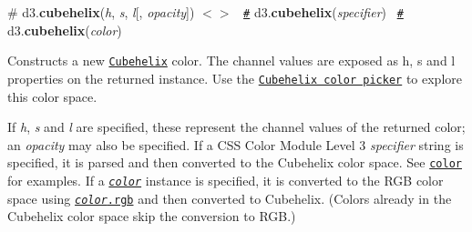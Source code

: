 \label{_cubehelix}%
\# d3.{\bfseries cubehelix}({\itshape h}, {\itshape s}, {\itshape l}\mbox{[}, {\itshape opacity}\mbox{]}) \href{https://github.com/d3/d3-color/blob/master/src/cubehelix.js#L32}{\tt $<$$>$}~\newline
 \href{#cubehelix}{\tt \#} d3.{\bfseries cubehelix}({\itshape specifier})~\newline
 \href{#cubehelix}{\tt \#} d3.{\bfseries cubehelix}({\itshape color})~\newline


Constructs a new \href{https://www.mrao.cam.ac.uk/~dag/CUBEHELIX/}{\tt Cubehelix} color. The channel values are exposed as {\ttfamily h}, {\ttfamily s} and {\ttfamily l} properties on the returned instance. Use the \href{http://bl.ocks.org/mbostock/ba8d75e45794c27168b5}{\tt Cubehelix color picker} to explore this color space.

If {\itshape h}, {\itshape s} and {\itshape l} are specified, these represent the channel values of the returned color; an {\itshape opacity} may also be specified. If a C\+SS Color Module Level 3 {\itshape specifier} string is specified, it is parsed and then converted to the Cubehelix color space. See \href{#color}{\tt color} for examples. If a \href{#color}{\tt {\itshape color}} instance is specified, it is converted to the R\+GB color space using \href{#color_rgb}{\tt {\itshape color}.rgb} and then converted to Cubehelix. (Colors already in the Cubehelix color space skip the conversion to R\+GB.) 